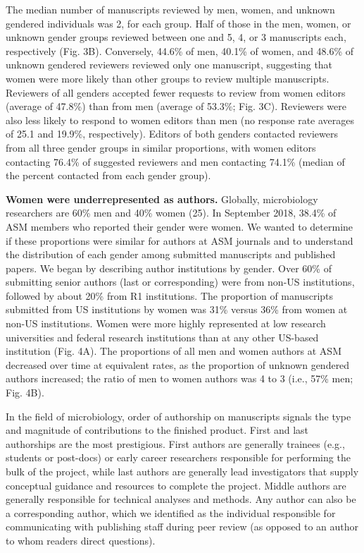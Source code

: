 \documentclass[11pt,]{article}
\begin{document}
The median number of manuscripts reviewed by men, women, and unknown
gendered individuals was 2, for each group. Half of those in the men,
women, or unknown gender groups reviewed between one and 5, 4, or 3
manuscripts each, respectively (Fig. 3B). Conversely, 44.6\% of men,
40.1\% of women, and 48.6\% of unknown gendered reviewers reviewed only
one manuscript, suggesting that women were more likely than other groups
to review multiple manuscripts. Reviewers of all genders accepted fewer
requests to review from women editors (average of 47.8\%) than from men
(average of 53.3\%; Fig. 3C). Reviewers were also less likely to respond
to women editors than men (no response rate averages of 25.1 and 19.9\%,
respectively). Editors of both genders contacted reviewers from all
three gender groups in similar proportions, with women editors
contacting 76.4\% of suggested reviewers and men contacting 74.1\%
(median of the percent contacted from each gender group).

\textbf{Women were underrepresented as authors.} Globally, microbiology
researchers are 60\% men and 40\% women (25). In September 2018, 38.4\%
of ASM members who reported their gender were women. We wanted to
determine if these proportions were similar for authors at ASM journals
and to understand the distribution of each gender among submitted
manuscripts and published papers. We began by describing author
institutions by gender. Over 60\% of submitting senior authors (last or
corresponding) were from non-US institutions, followed by about 20\%
from R1 institutions. The proportion of manuscripts submitted from US
institutions by women was 31\% versus 36\% from women at non-US
institutions. Women were more highly represented at low research
universities and federal research institutions than at any other
US-based institution (Fig. 4A). The proportions of all men and women
authors at ASM decreased over time at equivalent rates, as the
proportion of unknown gendered authors increased; the ratio of men to
women authors was 4 to 3 (i.e., 57\% men; Fig. 4B).

In the field of microbiology, order of authorship on manuscripts signals
the type and magnitude of contributions to the finished product. First
and last authorships are the most prestigious. First authors are
generally trainees (e.g., students or post-docs) or early career
researchers responsible for performing the bulk of the project, while
last authors are generally lead investigators that supply conceptual
guidance and resources to complete the project. Middle authors are
generally responsible for technical analyses and methods. Any author can
also be a corresponding author, which we identified as the individual
responsible for communicating with publishing staff during peer review
(as opposed to an author to whom readers direct questions).
\end{document}
